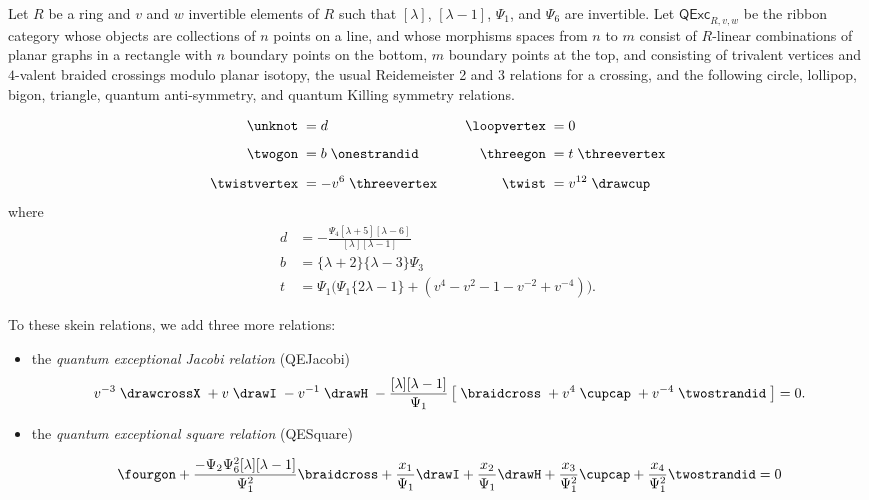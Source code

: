 \documentclass[12pt]{amsart}
\begin{document}
\begin{definition}\label{def:qexc}
Let $R$ be a ring and $v$ and $w$ invertible elements of $R$ such that
$[\lambda]$, $[\lambda-1]$, $\Psi_1$, and $\Psi_6$
are invertible.  Let
$\mathsf{QExc}_{R,v,w}$ be the ribbon category whose objects are collections
of $n$ points on a line, and whose morphisms spaces from $n$ to $m$ consist of
$R$-linear combinations of planar graphs in a rectangle with $n$ boundary
points on the bottom, $m$ boundary points at the top, and consisting of
trivalent vertices and $4$-valent braided crossings modulo planar isotopy, the
usual Reidemeister 2 and 3 relations for a crossing, and the
following circle, lollipop, bigon, triangle, quantum anti-symmetry, and
quantum Killing symmetry relations.

 \begin{equation}
    \label{eq:simple-rels-spec}
  \begin{aligned}
    \unknot\; &= d&\quad
    \loopvertex\;&=0\\[5pt]
      \twogon\;&= b\;\onestrandid&
        \threegon\; &= t\;\threevertex\\[5pt]
    \twistvertex\; &= -v^{6}\;\threevertex&
      \twist\; &= v^{12}\;\drawcup
  \end{aligned}
  \end{equation}
where
\begin{align*}
  d &= -\frac{\Psi_4 [\lambda+5][\lambda-6]}{[\lambda][\lambda-1]}\\
  b &= \{\lambda+2\}\{\lambda-3\}\Psi_3\\
  t &= \Psi_1 \bigl(\Psi_1 \{2\lambda -1\} + (v^4 - v^2 - 1 - v^{-2} + v^{-4})\bigr).
\end{align*}


To these skein relations, we add three more relations:
\begin{itemize}
\item the \emph{quantum exceptional Jacobi relation} (QEJacobi)
\begin{equation}
v^{-3} \;
\drawcrossX
\;+ v \;
\drawI
\; -v^{-1} \;
 \drawH
\;
 - \frac{[\lambda][\lambda-1]}{\Psi_1}
\left[\; \braidcross \;
 + v^{4}\;
\cupcap
\; + v^{-4} \;
 \twostrandid \;
 \right] = 0.\label{eq:quant-except-spec}
\end{equation}

\item the \emph{quantum exceptional square relation} (QESquare)

\begin{equation}
\label{eq:QESquare-w}
\fourgon + \frac{-\Psi_2\Psi_6^2[\lambda][\lambda-1]}{\Psi_1^2} \braidcross + \frac{x_1}{\Psi_1} \drawI + \frac{x_2}{\Psi_1} \drawH + \frac{x_3}{\Psi_1^2} \cupcap + \frac{x_4}{\Psi_1^2} \twostrandid =0
\end{equation}


\end{itemize}
\end{definition}
\end{document}
